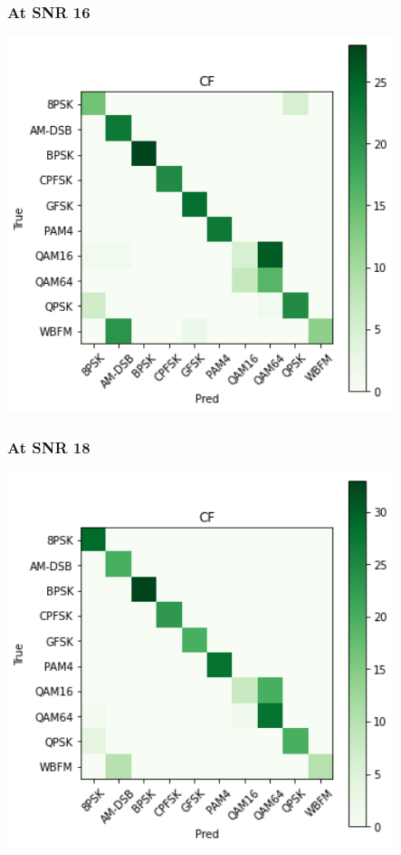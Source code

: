 \documentclass[12pt,a4paper]{article}
\begin{document}
\subsubsection{At SNR 16}
\begin{center}
\includegraphics[width=320pt]{imgs/snrs/snr14.png}
\end{center}
\subsubsection{At SNR 18}
\begin{center}
\includegraphics[width=320pt]{imgs/snrs/snr15.png}
\end{center}
\end{document}

